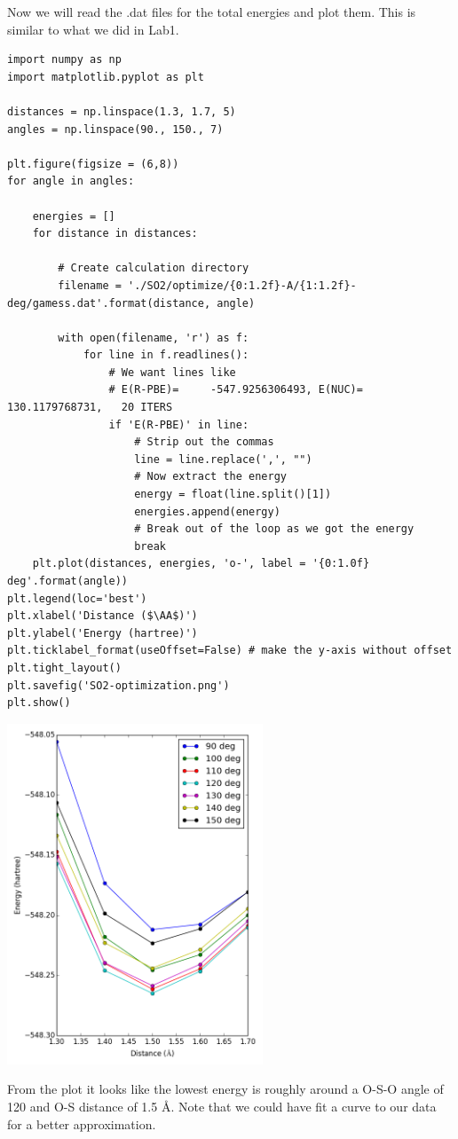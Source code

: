 \documentclass[11pt]{article}
\begin{document}
\begin{enumerate}
Now we will read the .dat files for the total energies and plot them. This is similar to what we did in Lab1. 

\begin{verbatim}
import numpy as np
import matplotlib.pyplot as plt

distances = np.linspace(1.3, 1.7, 5)
angles = np.linspace(90., 150., 7)

plt.figure(figsize = (6,8))
for angle in angles:
    
    energies = []
    for distance in distances:
        
        # Create calculation directory
        filename = './SO2/optimize/{0:1.2f}-A/{1:1.2f}-deg/gamess.dat'.format(distance, angle)

        with open(filename, 'r') as f:
            for line in f.readlines():
                # We want lines like
                # E(R-PBE)=     -547.9256306493, E(NUC)=  130.1179768731,   20 ITERS
                if 'E(R-PBE)' in line:
                    # Strip out the commas
                    line = line.replace(',', "")
                    # Now extract the energy
                    energy = float(line.split()[1])
                    energies.append(energy)
                    # Break out of the loop as we got the energy
                    break
    plt.plot(distances, energies, 'o-', label = '{0:1.0f} deg'.format(angle))
plt.legend(loc='best')
plt.xlabel('Distance ($\AA$)')
plt.ylabel('Energy (hartree)')
plt.ticklabel_format(useOffset=False) # make the y-axis without offset
plt.tight_layout()
plt.savefig('SO2-optimization.png')
plt.show()
\end{verbatim}

\includegraphics[width=3in]{./SO2-optimization.png}

From the plot it looks like the lowest energy is roughly around a O-S-O angle of 120\textdegree{} and O-S distance of 1.5 \AA{}. Note that we could have fit a curve to our data for a better approximation.
\end{enumerate}
\end{document}
